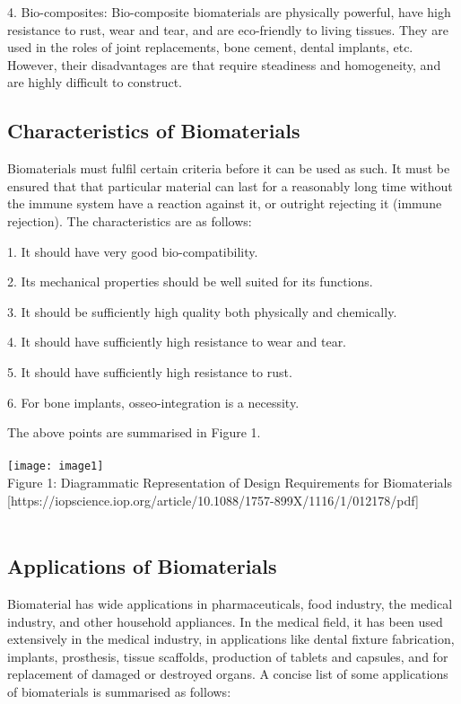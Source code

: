 \documentclass[11pt]{article}
\begin{document}
4. Bio-composites: Bio-composite biomaterials are physically powerful, have high resistance to rust, wear and tear, and are eco-friendly to living tissues. They are used in the roles of joint replacements, bone cement, dental implants, etc. However, their disadvantages are that require steadiness and homogeneity, and are highly difficult to construct.

\subsection*{Characteristics of Biomaterials}

Biomaterials must fulfil certain criteria before it can be used as such. It must be ensured that that particular material can last for a reasonably long time without the immune system have a reaction against it, or outright rejecting it (immune rejection). The characteristics are as follows:

1. It should have very good bio-compatibility.

2. Its mechanical properties should be well suited for its functions.

3. It should be sufficiently high quality both physically and chemically.

4. It should have sufficiently high resistance to wear and tear.

5. It should have sufficiently high resistance to rust.

6. For bone implants, osseo-integration is a necessity.

The above points are summarised in Figure 1.
\\
\\


\texttt{[image: image1]}
\\

Figure 1: Diagrammatic Representation of Design Requirements for Biomaterials [https://iopscience.iop.org/article/10.1088/1757-899X/1116/1/012178/pdf]
\\
\\
\subsection*{Applications of Biomaterials}

Biomaterial has wide applications in pharmaceuticals, food industry, the medical industry, and other household appliances. In the medical field, it has been used extensively in the medical industry, in applications like dental fixture fabrication, implants, prosthesis, tissue scaffolds, production of tablets and capsules, and for replacement of damaged or destroyed organs. A concise list of some applications of biomaterials is summarised as follows:
\end{document}
